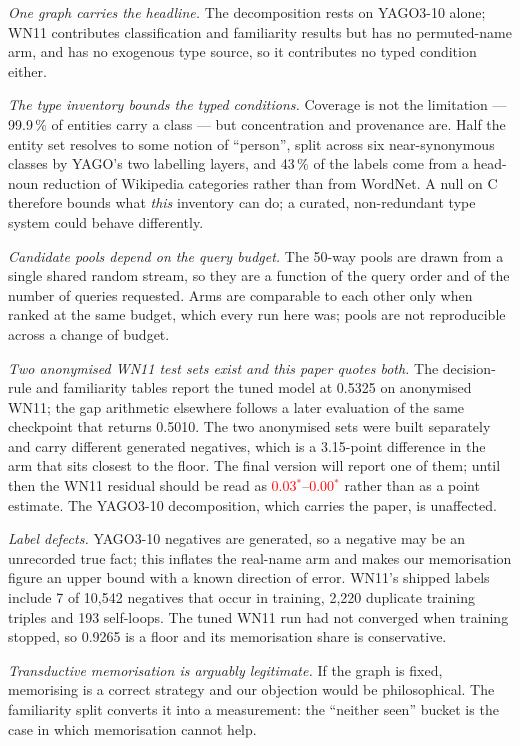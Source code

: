 \documentclass[conference]{IEEEtran}
\newcommand{\pv}[1]{\textcolor{red}{#1\ensuremath{^{\ast}}}}
\begin{document}
\emph{One graph carries the headline.} The decomposition rests on YAGO3-10 alone;
WN11 contributes classification and familiarity results but has no permuted-name
arm, and has no exogenous type source, so it contributes no typed condition
either.

\emph{The type inventory bounds the typed conditions.} Coverage is not the
limitation --- 99.9\,\% of entities carry a class --- but concentration and
provenance are. Half the entity set resolves to some notion of ``person'', split
across six near-synonymous classes by YAGO's two labelling layers, and 43\,\% of
the labels come from a head-noun reduction of Wikipedia categories rather than
from WordNet. A null on C therefore bounds what \emph{this} inventory can do; a
curated, non-redundant type system could behave differently.

\emph{Candidate pools depend on the query budget.} The 50-way pools are drawn
from a single shared random stream, so they are a function of the query order
and of the number of queries requested. Arms are comparable to each other only
when ranked at the same budget, which every run here was; pools are not
reproducible across a change of budget.

\emph{Two anonymised WN11 test sets exist and this paper quotes both.} The
decision-rule and familiarity tables report the tuned model at 0.5325 on
anonymised WN11; the gap arithmetic elsewhere follows a later evaluation of the
same checkpoint that returns 0.5010. The two anonymised sets were built
separately and carry different generated negatives, which is a 3.15-point
difference in the arm that sits closest to the floor. The final version will
report one of them; until then the WN11 residual should be read as
\pv{0.03}--\pv{0.00} rather than as a point estimate. The YAGO3-10
decomposition, which carries the paper, is unaffected.

\emph{Label defects.} YAGO3-10 negatives are generated, so a negative may be an
unrecorded true fact; this inflates the real-name arm and makes our memorisation
figure an upper bound with a known direction of error. WN11's shipped labels
include 7 of 10{,}542 negatives that occur in training, 2{,}220 duplicate
training triples and 193 self-loops. The tuned WN11 run had not converged when
training stopped, so 0.9265 is a floor and its memorisation share is
conservative.

\emph{Transductive memorisation is arguably legitimate.} If the graph is fixed,
memorising is a correct strategy and our objection would be philosophical. The
familiarity split converts it into a measurement: the ``neither seen'' bucket is
the case in which memorisation cannot help.
\end{document}
